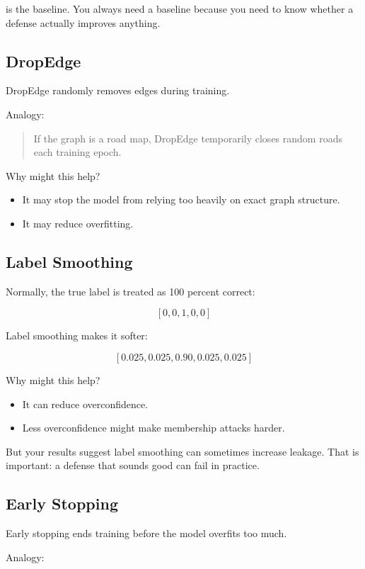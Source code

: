 \documentclass[11pt,a4paper]{article}
\newcommand{\code}[1]{\texttt{\detokenize{#1}}}
\begin{document}
\code{none} is the baseline. You always need a baseline because you need to know whether a defense actually improves anything.

\subsection{DropEdge}

DropEdge randomly removes edges during training.

Analogy:

\begin{quote}
If the graph is a road map, DropEdge temporarily closes random roads each training epoch.
\end{quote}

Why might this help?
\begin{itemize}
  \item It may stop the model from relying too heavily on exact graph structure.
  \item It may reduce overfitting.
\end{itemize}

\subsection{Label Smoothing}

Normally, the true label is treated as 100 percent correct:

\[
[0,0,1,0,0]
\]

Label smoothing makes it softer:

\[
[0.025,0.025,0.90,0.025,0.025]
\]

Why might this help?
\begin{itemize}
  \item It can reduce overconfidence.
  \item Less overconfidence might make membership attacks harder.
\end{itemize}

But your results suggest label smoothing can sometimes increase leakage. That is important: a defense that sounds good can fail in practice.

\subsection{Early Stopping}

Early stopping ends training before the model overfits too much.

Analogy:
\end{document}
